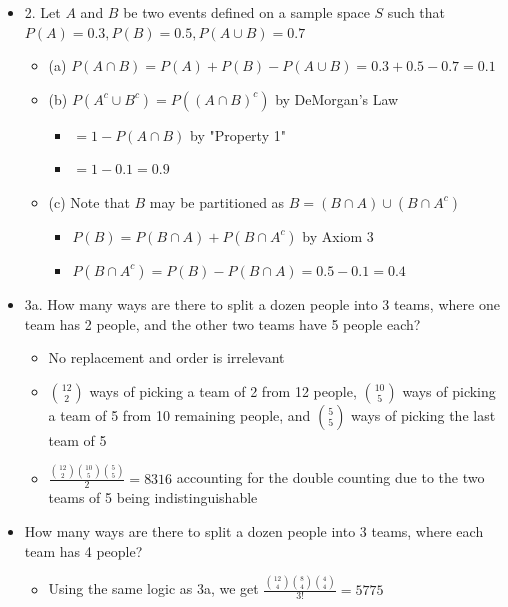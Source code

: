 \documentclass{article}
\begin{document}
\begin{itemize}
\subsection{Problem Set 1}
    \item 2. Let $A$ and $B$ be two events defined on a sample space $S$ such that $P(A)=0.3, P(B)=0.5, P(A \cup B)=0.7$
    \begin{itemize}
        \item (a) $P(A \cap B) = P(A) + P(B) - P(A \cup B) = 0.3+0.5-0.7 = 0.1$
        \item (b) $P(A^c \cup B^c) = P((A \cap B)^c)$ by DeMorgan's Law
        \begin{itemize}
            \item $= 1 - P(A \cap B)$ by "Property 1"
            \item $= 1 - 0.1 = 0.9$
        \end{itemize}
        \item (c) Note that $B$ may be partitioned as $B = (B \cap A) \cup (B \cap A^c)$
        \begin{itemize}
            \item $P(B) = P(B \cap A) + P(B \cap A^c)$ by Axiom 3
            \item $P(B \cap A^c) = P(B) - P(B \cap A) = 0.5-0.1 = 0.4$
        \end{itemize}
    \end{itemize}
    \item 3a. How many ways are there to split a dozen people into 3 teams, where one team has 2 people, and the other two teams have 5 people each?
    \begin{itemize}
        \item No replacement and order is irrelevant
        \item $\binom{12}{2}$ ways of picking a team of 2 from 12 people, $\binom{10}{5}$ ways of picking a team of 5 from 10 remaining people, and $\binom{5}{5}$ ways of picking the last team of 5
        \item $\frac{\binom{12}{2}\binom{10}{5}\binom{5}{5}}{2} = 8316$ accounting for the double counting due to the two teams of 5 being indistinguishable
    \end{itemize}
    \item How many ways are there to split a dozen people into 3 teams, where each team has 4 people?
    \begin{itemize}
        \item Using the same logic as 3a, we get $\frac{\binom{12}{4}\binom{8}{4}\binom{4}{4}}{3!} = 5775$

\end{itemize}
\end{itemize}
\end{document}
